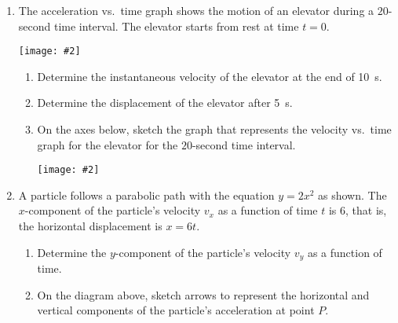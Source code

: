 \documentclass[12pt]{article}
\newcommand{\pic}[2]{\texttt{[image: \#2]}}
\begin{document}
\begin{enumerate}[leftmargin=15pt]
\item The acceleration vs.\ time graph shows the motion of an elevator during a
  $20$-second time interval. The elevator starts from rest at time $t=0$. 
  \begin{center}
    \pic{.7}{a-t.png}
  \end{center}
  \begin{enumerate}[noitemsep]
  \item Determine the instantaneous velocity of the elevator at the end of
    \SI{10}{s}.
    \vspace{1.5in}
  \item Determine the displacement of the elevator after \SI{5}{s}.
    \vspace{1.5in}
  \item On the axes below, sketch the graph that represents the velocity vs.\
    time graph for the elevator for the $20$-second time interval.
    \begin{center}
      \pic{.8}{v-t.png}
    \end{center}
    \newpage
  \end{enumerate}
  
\item A particle follows a parabolic path with the equation $y=2x^2$ as shown.
  The $x$-component of the particle's velocity $v_x$ as a function of time $t$
  is $6$, that is, the horizontal displacement is $x=6t$.
  \begin{center}
  \end{center}
  \begin{enumerate}[noitemsep]
  \item Determine the $y$-component of the particle's velocity $v_y$ as a
    function of time.
  \item On the diagram above, sketch arrows to represent the horizontal and
    vertical components of the particle's acceleration at point $P$.
  \end{enumerate}
\end{enumerate}
\end{document}
